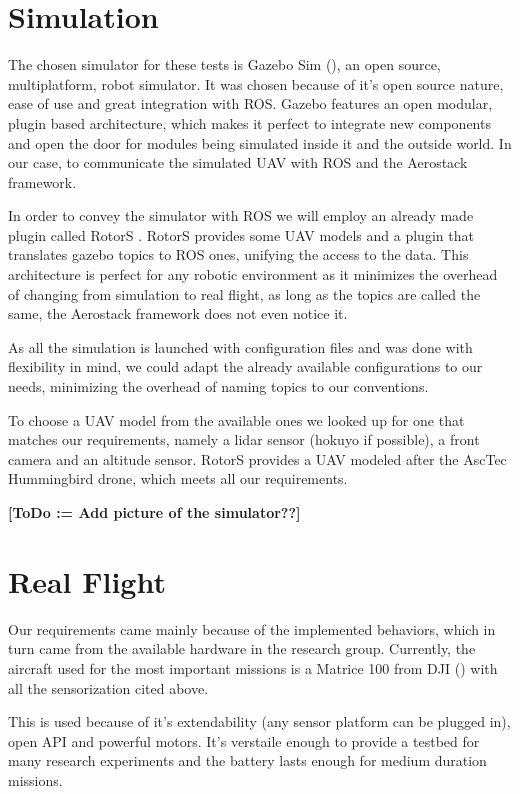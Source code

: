 \section{Simulation} \label{ch_5:sect:simulation}

  The chosen simulator for these tests is Gazebo Sim (\cite{gazebo_web}), an open source, multiplatform, robot simulator. It was chosen because of it's open source nature, ease of use and great integration with ROS. Gazebo features an open modular, plugin based architecture, which makes it perfect to integrate new components and open the door for modules being simulated inside it and the outside world. In our case, to communicate the simulated UAV with ROS and the Aerostack framework.

  In order to convey the simulator with ROS we will employ an already made plugin called RotorS \cite{rotors2016}. RotorS provides some UAV models and a plugin that translates gazebo topics to ROS ones, unifying the access to the data. This architecture is perfect for any robotic environment as it minimizes the overhead of changing from simulation to real flight, as long as the topics are called the same, the Aerostack framework does not even notice it.

  As all the simulation is launched with configuration files and was done with flexibility in mind, we could adapt the already available configurations to our needs, minimizing the overhead of naming topics to our conventions.

  To choose a UAV model from the available ones we looked up for one that matches our requirements, namely a lidar sensor (hokuyo if possible), a front camera and an altitude sensor. RotorS provides a UAV modeled after the AscTec Hummingbird \cite{hummingbird_web} drone, which meets all our requirements.

  \textbf{[ToDo := Add picture of the simulator??]}

\section{Real Flight} \label{ch_5:sect:real_flight}

  Our requirements came mainly because of the implemented behaviors, which in turn came from the available hardware in the research group. Currently, the aircraft used for the most important missions is a Matrice 100 from DJI (\cite{dji_matrice_web}) with all the sensorization cited above.

  This is used because of it's extendability (any sensor platform can be plugged in), open API and powerful motors. It's verstaile enough to provide a testbed for many research experiments and the battery lasts enough for medium duration missions.

